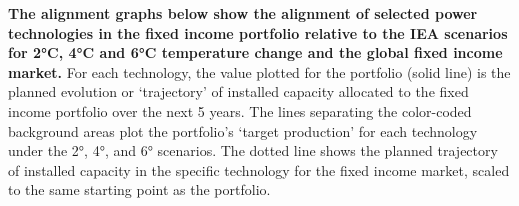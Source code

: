 \documentclass[10pt,table,a4]{article}\usepackage[]{graphicx}\usepackage[]{color}
\begin{document}
	\begin{multicols}{2}
		\textbf{The alignment graphs below show the alignment of selected power technologies in the fixed income portfolio relative to the IEA scenarios for 2°C, 4°C and 6°C temperature change and the global fixed income market.}
		For each technology, the value plotted for the portfolio (solid line) is the planned evolution or `trajectory' of installed capacity allocated to the fixed income portfolio over the next 5 years. The lines separating the color-coded background areas plot the portfolio's `target production' for each technology under the 2°, 4°, and 6° scenarios. The dotted line shows the planned trajectory of installed capacity in the specific technology for the fixed income market, scaled to the same starting point as the portfolio.                    
		
	\end{multicols}	
	
	
	
\end{document}

